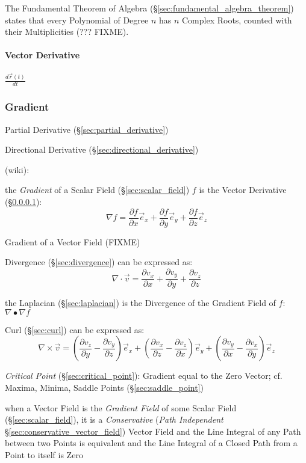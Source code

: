 The Fundamental Theorem of Algebra (\S\ref{sec:fundamental_algebra_theorem})
states that every Polynomial of Degree $n$ has $n$ Complex Roots, counted with
their Multiplicities (??? FIXME).



\paragraph{Vector Derivative}\label{sec:vector_derivative}\hfill

$\frac{d\vec{r}(t)}{dt}$



\subsubsection{Gradient}\label{sec:gradient}

Partial Derivative (\S\ref{sec:partial_derivative})

Directional Derivative (\S\ref{sec:directional_derivative})

(wiki):

the \emph{Gradient} of a Scalar Field (\S\ref{sec:scalar_field}) $f$ is the
Vector Derivative (\S\ref{sec:vector_derivative}):
\[
  \nabla f =
    \frac{\partial f}{\partial x}\vec{e}_x +
    \frac{\partial f}{\partial y}\vec{e}_y +
    \frac{\partial f}{\partial z}\vec{e}_z
\]

Gradient of a Vector Field (FIXME)

Divergence (\S\ref{sec:divergence}) can be expressed as:
\[
  \nabla \cdot \vec{v} =
    \frac{\partial v_x}{\partial x} +
    \frac{\partial v_y}{\partial y} +
    \frac{\partial v_z}{\partial z}
\]

the Laplacian (\S\ref{sec:laplacian}) is the Divergence of the Gradient Field
of $f$: $\nabla \bullet \nabla f$

Curl (\S\ref{sec:curl}) can be expressed as:
\[
  \nabla\times\vec{v} =
    (\frac{\partial v_z}{\partial y}-\frac{\partial v_y}{\partial z})\vec{e}_x +
    (\frac{\partial v_x}{\partial z}-\frac{\partial v_z}{\partial x})\vec{e}_y +
    (\frac{\partial v_y}{\partial x}-\frac{\partial v_x}{\partial y})\vec{e}_z
\]

\emph{Critical Point} (\S\ref{sec:critical_point}): Gradient equal to the Zero
Vector; cf. Maxima, Minima, Saddle Points (\S\ref{sec:saddle_point})

when a Vector Field is the \emph{Gradient Field} of some Scalar Field
(\S\ref{sec:scalar_field}), it is a \emph{Conservative} (\emph{Path
  Independent} \S\ref{sec:conservative_vector_field}) Vector Field and the Line
Integral of any Path between two Points is equivalent and the Line Integral of
a Closed Path from a Point to itself is Zero



